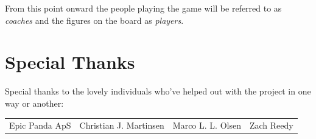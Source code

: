\documentclass[a4paper]{book}
\begin{document}
\begin{note}
    From this point onward the people playing the game will be referred to as \textit{coaches} and the figures on the board as \textit{players}.
\end{note}

\section*{Special Thanks}
Special thanks to the lovely individuals who've helped out with the project in one way or another:
\begin{center}
    \begin{tabular}{cccc}
        Epic Panda ApS & Christian J. Martinsen & Marco L. L. Olsen & Zach Reedy\\
    \end{tabular}
\end{center}

\tableofcontents
\mainmatter

\appendix
%

%
\end{document}
